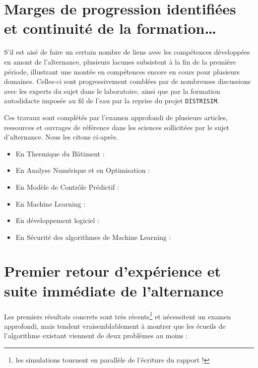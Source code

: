 \newpage
\section{Marges de progression identifiées et continuité de la formation…}\label{sec:marges-de-progression-identifiees-et-continuite-de-la-formation}

    S'il est aisé de faire un certain nombre de liens avec les compétences développées en amont de l'alternance, plusieurs lacunes subsistent à la fin de la première période, illustrant une montée en compétences encore en cours pour plusieurs domaines.
    Celles-ci sont progressivement comblées par de nombreuses discussions avec les experts du sujet dans le laboratoire, ainsi que par la formation autodidacte imposée au fil de l'eau par la reprise du projet \texttt{DISTRISIM}.

    Ces travaux sont complétés par l'examen approfondi de plusieurs articles, ressources et ouvrages de référence dans les sciences sollicitées par le sujet d'alternance.
    Nous les citons ci-après.
    \begin{itemize}
        \item En Thermique du Bâtiment :~\cite{manuel_energie_batiment, audit_energy_engineering}
        \item En Analyse Numérique et en Optimisation :~\cite{numerical_analysis, NIA}
        \item En Modèle de Contrôle Prédictif :~\cite{MPC_needs}
        \item En Machine Learning :~\cite{WML, Goodfellow-et-al-2016, UDL}
        \item En développement logiciel :~\cite{clean_code}
        \item En Sécurité des \gls{algorithme}s de Machine Learning :~\cite{ENISA_securing_ML, ENISA_AI_standardization, ENISA_AI_cyber_research, ENISA_AI_forecasting_demand_electricity}
    \end{itemize}

\section{Premier retour d'expérience et suite immédiate de l'alternance}\label{sec:premier-retour-d'experience-et-suite-immediate-de-l'alternance}

    Les premiers résultats concrets sont très récents\footnote{les simulations tournent en parallèle de l'écriture du rapport !} et nécessitent un examen approfondi, mais tendent vraisemblablement à montrer que les écueils de l'\gls{algorithme} existant viennent de deux problèmes au moins :

